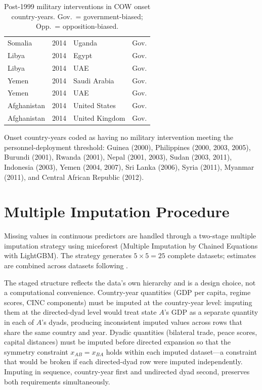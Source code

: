 \begin{table}[p]
\begin{tabular}{@{}llll@{}}
    Somalia        & 2014 & Uganda          & Gov. \\
    Libya          & 2014 & Egypt           & Gov. \\
    Libya          & 2014 & UAE             & Gov. \\
    Yemen          & 2014 & Saudi Arabia    & Gov. \\
    Yemen          & 2014 & UAE             & Gov. \\
    Afghanistan    & 2014 & United States   & Gov. \\
    Afghanistan    & 2014 & United Kingdom  & Gov. \\
    \bottomrule
  \end{tabular}
  \caption{Post-1999 military interventions in COW onset country-years.
    Gov.\ = government-biased; Opp.\ = opposition-biased.}
  \label{tab:post1999}
\end{table}

Onset country-years coded as having no military intervention meeting the
personnel-deployment threshold: Guinea (2000), Philippines (2000, 2003, 2005),
Burundi (2001), Rwanda (2001), Nepal (2001, 2003), Sudan (2003, 2011),
Indonesia (2003), Yemen (2004, 2007), Sri Lanka (2006), Syria (2011),
Myanmar (2011), and Central African Republic (2012).

\section{Multiple Imputation Procedure}
\label{app:imputation}

Missing values in continuous predictors are handled through a two-stage
multiple imputation strategy using miceforest (Multiple Imputation by Chained
Equations with LightGBM).  The strategy generates $5 \times 5 = 25$ complete
datasets; estimates are combined across datasets following \citet{rubin1987}.

The staged structure reflects the data's own hierarchy and is a design
choice, not a computational convenience.  Country-year quantities (GDP per
capita, regime scores, CINC components) must be imputed at the country-year
level: imputing them at the directed-dyad level would treat state $A$'s GDP
as a separate quantity in each of $A$'s dyads, producing inconsistent imputed
values across rows that share the same country and year.  Dyadic quantities
(bilateral trade, peace scores, capital distances) must be imputed before
directed expansion so that the symmetry constraint $x_{AB} = x_{BA}$ holds
within each imputed dataset---a constraint that would be broken if each
directed-dyad row were imputed independently.  Imputing in sequence,
country-year first and undirected dyad second, preserves both requirements
simultaneously.

